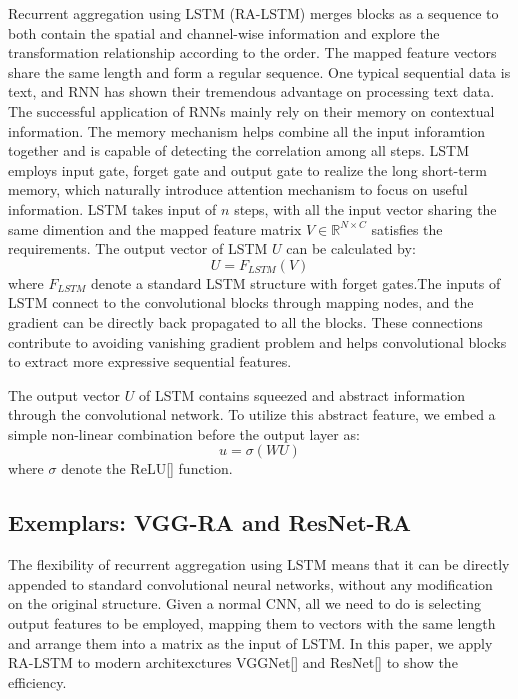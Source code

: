 \documentclass[runningheads]{llncs}
\begin{document}
Recurrent aggregation using LSTM (RA-LSTM) merges blocks as a sequence to both contain the spatial and channel-wise information and explore the transformation relationship according to the order. The mapped feature vectors share the same length and form a regular sequence. One typical sequential data is text, and RNN has shown their tremendous advantage on processing text data. The successful application of RNNs mainly rely on their memory on contextual information. The memory mechanism helps combine all the input inforamtion together and is capable of detecting the correlation among all steps. LSTM employs input gate, forget gate and output gate to realize the long short-term memory, which naturally introduce attention mechanism to focus on useful information. LSTM takes input of $n$ steps, with all the input vector sharing the same dimention and the mapped feature matrix $V\in \mathbb{R}^{N\times C}$ satisfies the requirements. The output vector of LSTM $U$ can be calculated by:
\begin{equation}
U = F_{LSTM}(V)
\end{equation}
where $F_{LSTM}$ denote a standard LSTM structure with forget gates.The inputs of LSTM connect to the convolutional blocks through mapping nodes, and the gradient can be directly back propagated to all the blocks. These connections contribute to avoiding vanishing gradient problem and helps convolutional blocks to extract more expressive sequential features.

The output vector $U$ of LSTM contains squeezed and abstract information through the convolutional network. To utilize this abstract feature, we embed a simple non-linear combination before the output layer as:
\begin{equation}
u = \sigma(WU)
\end{equation}
where $\sigma$ denote the ReLU[] function. 

\subsection{Exemplars: VGG-RA and ResNet-RA}
The flexibility of recurrent aggregation using LSTM means that it can be directly appended to standard convolutional neural networks, without any modification on the original structure. Given a normal CNN, all we need to do is selecting output features to be employed, mapping them to vectors with the same length and arrange them into a matrix as the input of LSTM. In this paper, we apply RA-LSTM to modern architexctures VGGNet[] and ResNet[] to show the efficiency.
\end{document}
